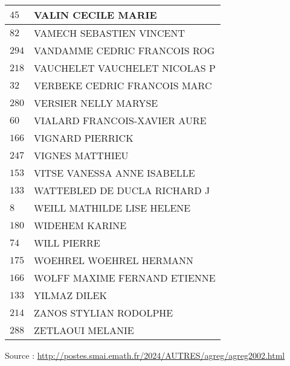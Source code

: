 \begin{xltabular}{\linewidth}{|l|X|}
    \hline
    $45$ & VALIN CECILE MARIE \\
    \hline
    $82$ & VAMECH SEBASTIEN VINCENT \\
    \hline
    $294$ & VANDAMME CEDRIC FRANCOIS ROG \\
    \hline
    $218$ & VAUCHELET VAUCHELET NICOLAS P \\
    \hline
    $32$ & VERBEKE CEDRIC FRANCOIS MARC \\
    \hline
    $280$ & VERSIER NELLY MARYSE \\
    \hline
    $60$ & VIALARD FRANCOIS-XAVIER AURE \\
    \hline
    $166$ & VIGNARD PIERRICK \\
    \hline
    $247$ & VIGNES MATTHIEU \\
    \hline
    $153$ & VITSE VANESSA ANNE ISABELLE \\
    \hline
    $133$ & WATTEBLED DE DUCLA RICHARD J \\
    \hline
    $8$ & WEILL MATHILDE LISE HELENE \\
    \hline
    $180$ & WIDEHEM KARINE \\
    \hline
    $74$ & WILL PIERRE \\
    \hline
    $175$ & WOEHREL WOEHREL HERMANN \\
    \hline
    $166$ & WOLFF MAXIME FERNAND ETIENNE \\
    \hline
    $133$ & YILMAZ DILEK \\
    \hline
    $214$ & ZANOS STYLIAN RODOLPHE \\
    \hline
    $288$ & ZETLAOUI MELANIE \\
    \hline
  \end{xltabular}

  \begin{flushright}
    {\tiny Source : \url{http://postes.smai.emath.fr/2024/AUTRES/agreg/agreg2002.html}}
  \end{flushright}

